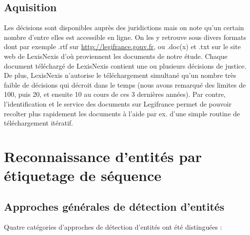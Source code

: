 \subsection{Aquisition}
Les décisions sont disponibles auprès des juridictions mais on note qu'un certain nombre d'entre elles est accessible en ligne. On les y retrouve sous divers formats dont par exemple .rtf sur \url{http://legifrance.gouv.fr}, ou .doc(x) et .txt sur le site web de LexisNexis d'où proviennent les documents de notre étude. Chaque document téléchargé de LexisNexis contient une ou plusieurs décisions de justice. De plus, LexisNexis n'autorise le téléchargement simultané qu'un nombre très faible de décisions qui décroit dans le temps (nous avons remarqué des limites de 100, puis 20, et ensuite 10 au cours de ces 3 dernières années). Par contre, l'identification et le service des documents sur Legifrance permet de pouvoir recolter plus rapidement les documents à l'aide par ex. d'une simple routine de téléchargement itératif.




\section{Reconnaissance d'entités par étiquetage de séquence}
\label{sec:structuration:biblio}

\subsection{Approches générales de détection d'entités}

Quatre catégories d'approches de détection d'entités ont été distinguées \citep{chau2002nerwithNN}:

